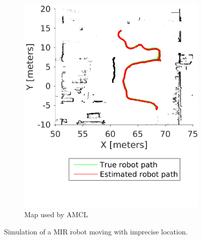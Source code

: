 \begin{figure}
\begin{subfigure}[b]{0.45\textwidth}
		\includegraphics[width=\textwidth]{figures/static_mapping/simulated_robot_estimate_total_edited}
		\caption{Map used by AMCL}
		\label{fig:simulated_robot_estimate_total_edited}
	\end{subfigure}
	\caption{Simulation of a MIR robot moving with imprecise location.}
	\label{fig:simulated_location_error}
\end{figure}
